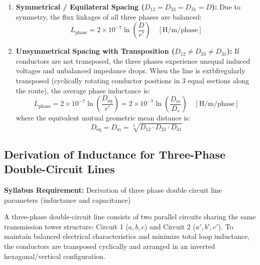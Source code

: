 \documentclass[11pt,a4paper]{article}
\newcommand{\syllabusitem}[1]{%
  \begin{tcolorbox}[enhanced, colback=AnthOrange!8, colframe=AnthOrange, boxrule=0.4pt, arc=3pt, left=7pt, right=7pt, top=3pt, bottom=3pt]
    \small\sffamily\textbf{\color{AnthOrange}Syllabus Requirement:} #1
  \end{tcolorbox}
}
\begin{document}
\begin{enumerate}
  \item \textbf{Symmetrical / Equilateral Spacing ($D_{12} = D_{23} = D_{31} = D$):}
    Due to symmetry, the flux linkages of all three phases are balanced:
    \begin{equation}
      L_{\text{phase}} = 2 \times 10^{-7} \ln\left(\frac{D}{r'}\right) \quad [\text{H/m/phase}]
    \end{equation}
  \item \textbf{Unsymmetrical Spacing with Transposition ($D_{12} \neq D_{23} \neq D_{31}$):}
    If conductors are not transposed, the three phases experience unequal induced voltages and unbalanced impedance drops. When the line is 	extbf{regularly transposed} (cyclically rotating conductor positions in 3 equal sections along the route), the average phase inductance is:
    \begin{equation}
      L_{\text{phase}} = 2 \times 10^{-7} \ln\left(\frac{D_{\text{eq}}}{r'}\right) = 2 \times 10^{-7} \ln\left(\frac{D_m}{D_s}\right) \quad [\text{H/m/phase}]
    \end{equation}
    where the equivalent mutual geometric mean distance is:
    \begin{equation}
      D_{\text{eq}} = D_m = \sqrt[3]{D_{12} \cdot D_{23} \cdot D_{31}}
    \end{equation}
\end{enumerate}

\clearpage
\subsection{Derivation of Inductance for Three-Phase Double-Circuit Lines}

\syllabusitem{Derivation of three phase double circuit line parameters (inductance and capacitance)}

A three-phase double-circuit line consists of two parallel circuits sharing the same transmission tower structure: Circuit 1 ($a, b, c$) and Circuit 2 ($a', b', c'$). To maintain balanced electrical characteristics and minimize total loop inductance, the conductors are transposed cyclically and arranged in an inverted hexagonal/vertical configuration.
\end{document}
